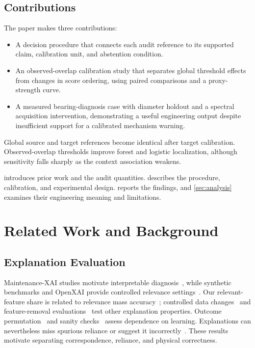 \documentclass[conference]{IEEEtran}
\begin{document}
\subsection{Contributions}
The paper makes three contributions:
\begin{itemize}
\item A decision procedure that connects each audit reference to its supported claim, calibration unit, and abstention condition.
\item An observed-overlap calibration study that separates global threshold effects from changes in score ordering, using paired comparisons and a proxy-strength curve.
\item A measured bearing-diagnosis case with diameter holdout and a spectral acquisition intervention, demonstrating a useful engineering output despite insufficient support for a calibrated mechanism warning.
\end{itemize}
Global source and target references become identical after target calibration. Observed-overlap thresholds improve forest and logistic localization, although sensitivity falls sharply as the context association weakens.

 introduces prior work and the audit quantities.  describes the procedure, calibration, and experimental design.  reports the findings, and \cref{sec:analysis} examines their engineering meaning and limitations.

\section{Related Work and Background}
\label{sec:background}
\subsection{Explanation Evaluation} Maintenance-XAI studies motivate interpretable diagnosis~\cite{matzka2020explainable,vollert2021interpretable}, while synthetic benchmarks and OpenXAI provide controlled relevance settings~\cite{liu2021synthetic,agarwal2022openxai}. Our relevant-feature share is related to relevance mass accuracy~\cite{arras2022clevr}; controlled data changes~\cite{zhou2022attribute} and feature-removal evaluations~\cite{hooker2019roar,rong2022road} test other explanation properties. Outcome permutation~\cite{altmann2010permutation} and sanity checks~\cite{adebayo2018sanity} assess dependence on learning. Explanations can nevertheless miss spurious reliance or suggest it incorrectly~\cite{adebayo2022spurious}. These results motivate separating correspondence, reliance, and physical correctness.
\end{document}
